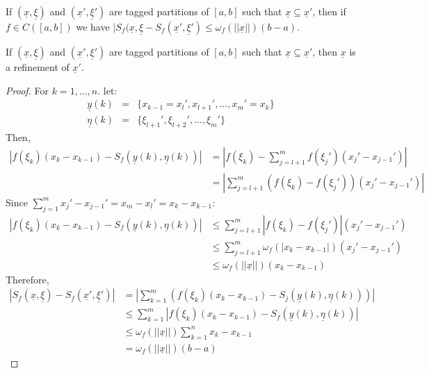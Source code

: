 \begin{theorem}[Theorem II]
    If $(\underline{x}, \underline{\xi})$ and $(\underline{x}', \underline{\xi}')$ are tagged partitions of $[a,b]$ such that $\underline{x} \subseteq \underline{x}'$, then if $f \in C([a,b])$ we have $|S_f(\underline{x}, \underline{\xi} - S_f(\underline{x}', \underline{\xi}') \leq \omega_f(||\underline{x}||)(b-a)$.
\end{theorem}

\begin{definition}[Refinement]
    If $(\underline{x}, \underline{\xi})$ and $(\underline{x}', \underline{\xi}')$ are tagged partitions of $[a,b]$ such that $\underline{x} \subseteq \underline{x}'$, then $\underline{x}$ is a refinement of $\underline{x}'$.
\end{definition}

\begin{proof}
    For $k = 1, ..., n$. let:
    \begin{eqnarray*}
        \underline{y}(k) &=& \{ x_{k-1} = x_l', x_{l+1}', ..., x_m' = x_k\} \\
        \underline{\eta}(k) &=& \{ \xi_{l+1}', \xi_{l+2}', ..., \xi_{m}'\}
    \end{eqnarray*}
    Then,
    \begin{align*}
        |f(\xi_k)(x_k - x_{k-1}) - S_f(\underline{y}(k), \underline{\eta}(k))| &= \left |
            f(\xi_k) - \sum \limits_{j=l+1}^m f(\xi_j')(x_j' -x_{j-1}') 
        \right | \\
        &= 
        \left |
            \sum \limits_{j=l+1}^m (f(\xi_k) - f(\xi_j'))(x_j' -x_{j-1}') 
        \right |
    \end{align*}
    Since $\sum_{j=1}^m x_j' - x_{j-1}' = x_m - x_l' = x_k - x_{k-1}$:
    \begin{align*}
        |f(\xi_k)(x_k - x_{k-1}) - S_f(\underline{y}(k), \underline{\eta}(k))| &\leq \sum \limits_{j=l+1}^m |f(\xi_k) - f(\xi_j')|(x_j' - x_{j-1}') \\
        &\leq \sum \limits_{j=l+1}^m \omega_f(|x_k - x_{k-1}|)(x_j' - x_{j-1}') \\
        &\leq \omega_f(||\underline{x}||)(x_k - x_{k-1})
    \end{align*}
    Therefore,
    \begin{align*}
        |S_f(\underline{x}, \underline{\xi}) - S_f(\underline{x}', \underline{\xi}')| &= 
        \left |
            \sum \limits_{k=1}^m (f(\xi_k)(x_k - x_{k-1}) - S_j(\underline{y}(k), \underline{\eta}(k)))
        \right | \\
        & \leq
        \sum \limits_{k=1}^m |f(\xi_k)(x_k - x_{k-1}) - S_f(\underline{y}(k), \underline{\eta}(k))| \\
        & \leq \omega_f(||\underline{x}||)\sum \limits_{k=1}^n x_k - x_{k-1} \\
        &= \omega_f(||\underline{x}||)(b-a)
    \end{align*}
\end{proof}


